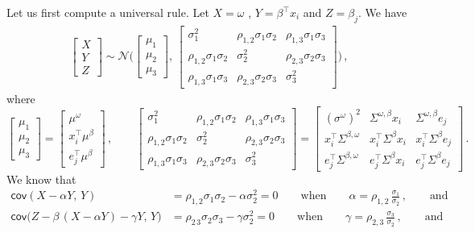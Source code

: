 \documentclass{custom}
\begin{document}
Let us first compute a universal rule. Let $X=\omega$ , $Y=\beta^\top x_i$
and $Z=\beta_{j}$. We have
\begin{align}\label{eq:defXYZ}
\begin{bmatrix}
X\\
Y\\
Z
\end{bmatrix}\sim\mathcal{N}\Biggl(\begin{bmatrix}
\mu_{1}\\
\mu_{2}\\
\mu_{3}
\end{bmatrix},\,\begin{bmatrix}
\sigma_{1}^{2} & \rho_{1,2}\sigma_{1}\sigma_{2} & \rho_{1,3}\sigma_{1}\sigma_{3}\\
\rho_{1,2}\sigma_{1}\sigma_{2} & \sigma_{2}^{2} & \rho_{2,3}\sigma_{2}\sigma_{3}\\
\rho_{1,3}\sigma_{1}\sigma_{3} & \rho_{2,3}\sigma_{2}\sigma_{3} & \sigma_{3}^{2}
\end{bmatrix}\Biggr)\,,
\end{align}
where 
\[
\begin{bmatrix}
\mu_{1}\\
\mu_{2} \\
\mu_{3}
\end{bmatrix}=\begin{bmatrix}
\mu^{\omega}\\[0.25em]
x_{i}^\top \mu^\beta\\[0.25em]
e_{j}^{\top}\mu^{\beta}
\end{bmatrix}\,,\qquad \begin{bmatrix}
\sigma_{1}^{2} & \rho_{1,2}\sigma_{1}\sigma_{2} & \rho_{1,3}\sigma_{1}\sigma_{3}\\
\rho_{1,2}\sigma_{1}\sigma_{2} & \sigma_{2}^{2} & \rho_{2,3}\sigma_{2}\sigma_{3}\\
\rho_{1,3}\sigma_{1}\sigma_{3} & \rho_{2,3}\sigma_{2}\sigma_{3} & \sigma_{3}^{2}
\end{bmatrix}= \begin{bmatrix}
(\sigma^{\omega})^{2} & \Sigma^{\omega,\beta}x_{i} & \Sigma^{\omega,\beta}e_{j}\\[0.25em]
x_{i}^{\top}\Sigma^{\beta,\omega} & x_{i}^{\top}\Sigma^{\beta}x_{i} & x_{i}^{\top}\Sigma^{\beta}e_{j}\\[0.25em]
e_{j}^{\top}\Sigma^{\beta,\omega} & e_{j}^{\top}\Sigma^{\beta}x_{i} & e_{j}^{\top}\Sigma^{\beta}e_{j}
\end{bmatrix}\,.
\]
We know that 
\begin{align*}
\mathsf{cov}(X-\alpha Y,\,Y) & =\rho_{1,2}\sigma_{1}\sigma_{2}-\alpha\sigma_{2}^{2}=0\qquad\text{when}\qquad\alpha=\rho_{1,2}\,\frac{\sigma_{1}}{\sigma_{2}}\,,\qquad\text{and}\\
\mathsf{cov}\bigl(Z-\beta\,(X-\alpha Y)-\gamma Y,\,Y\bigr) & =\rho_{2\,3}\sigma_{2}\sigma_{3}-\gamma\sigma_{2}^{2}=0\qquad\text{when}\qquad\gamma=\rho_{2,3}\,\frac{\sigma_{3}}{\sigma_{2}}\,,\qquad\text{and}
\end{align*}
\end{document}
